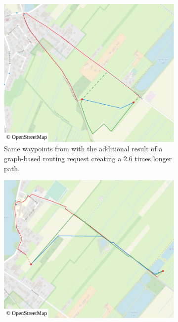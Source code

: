 			\begin{figure}[h!]
				\begin{minipage}[t]{.48\textwidth}
					\begin{subfigure}[t]{\linewidth}
						\includegraphics[width=\textwidth]{images/qgis-routing-rural-routing-6-graph-based}
						\caption{Same waypoints from  with the additional result of a graph-based routing request creating a 2.6 times longer path.}
						\label{fig:eval-rural-graph-based-comparison-6}
					\end{subfigure}
				\end{minipage}
				\hfill
				\begin{minipage}[t]{.48\textwidth}
					\begin{subfigure}[t]{\linewidth}
						\includegraphics[width=\textwidth]{images/qgis-routing-rural-routing-17-graph-based}

\end{subfigure}
\end{minipage}
\end{figure}

